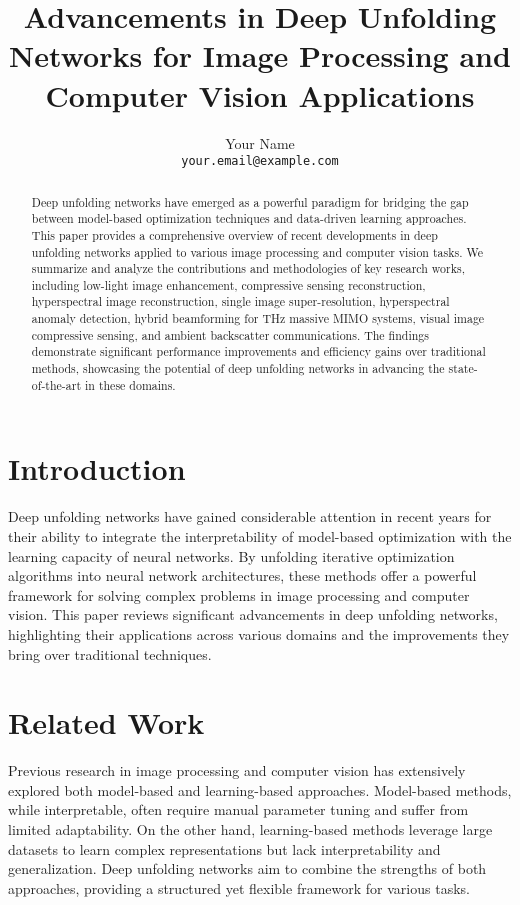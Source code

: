 \documentclass[11pt]{article}
\title{Advancements in Deep Unfolding Networks for Image Processing and Computer Vision Applications}
\author{Your Name \\
\texttt{your.email@example.com}}
\date{}
\begin{document}
\maketitle

\begin{abstract}
Deep unfolding networks have emerged as a powerful paradigm for bridging the gap between model-based optimization techniques and data-driven learning approaches. This paper provides a comprehensive overview of recent developments in deep unfolding networks applied to various image processing and computer vision tasks. We summarize and analyze the contributions and methodologies of key research works, including low-light image enhancement, compressive sensing reconstruction, hyperspectral image reconstruction, single image super-resolution, hyperspectral anomaly detection, hybrid beamforming for THz massive MIMO systems, visual image compressive sensing, and ambient backscatter communications. The findings demonstrate significant performance improvements and efficiency gains over traditional methods, showcasing the potential of deep unfolding networks in advancing the state-of-the-art in these domains.
\end{abstract}

\section{Introduction}
Deep unfolding networks have gained considerable attention in recent years for their ability to integrate the interpretability of model-based optimization with the learning capacity of neural networks. By unfolding iterative optimization algorithms into neural network architectures, these methods offer a powerful framework for solving complex problems in image processing and computer vision. This paper reviews significant advancements in deep unfolding networks, highlighting their applications across various domains and the improvements they bring over traditional techniques.

\section{Related Work}
Previous research in image processing and computer vision has extensively explored both model-based and learning-based approaches. Model-based methods, while interpretable, often require manual parameter tuning and suffer from limited adaptability. On the other hand, learning-based methods leverage large datasets to learn complex representations but lack interpretability and generalization. Deep unfolding networks aim to combine the strengths of both approaches, providing a structured yet flexible framework for various tasks.
\end{document}
